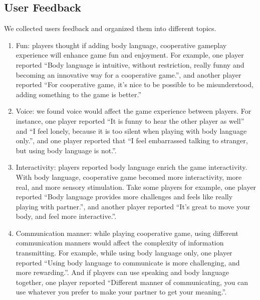 \subsection{User Feedback}
	We collected users feedback and organized them into different topics.
\begin{enumerate}
  \item Fun:  players thought if adding body language, cooperative gameplay experience will enhance game fun and enjoyment. For example, one player reported ``Body language is intuitive, without restriction, really funny and becoming an innovative way for a cooperative game.'', and another player reported
	``For cooperative game, it's nice to be possible to be misunderstood, adding something to the game is better.''



  \item Voice: we found voice would affect the game experience between players. For instance, one player reported ``It is funny to hear the other player as well'' and ``I feel lonely, because it is too silent when playing with body language only.'', and one player reported that ``I feel embarrassed talking to stranger, but using body language is not.''.


  \item Interactivity: players reported body language enrich the game interactivity. With body language, cooperative game becomed more interactivity, more real, and more sensory stimulation. Take some players for example, one player reported ``Body language provides more challenges and feels like really playing with partner.'', and another player reported ``It's great to move your body, and feel more interactive.''. 



  \item Communication manner: while playing cooperative game, using different communication manners would affect the complexity of information transmitting. For example, while using body language only, one player reported ``Using body language to communicate is more challenging, and more rewarding.''. And if players can use speaking and body language together, one player reported ``Different manner of communicating, you can use whatever you prefer to make your partner to get your meaning.''. 



\end{enumerate}

